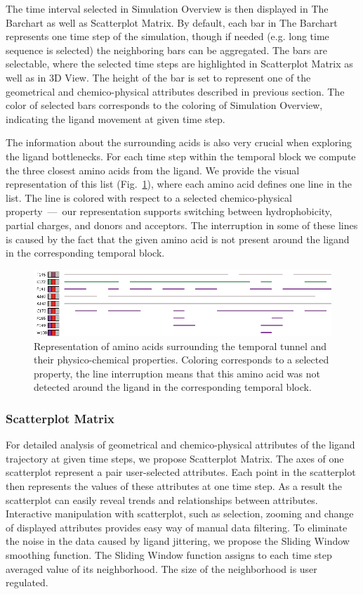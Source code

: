 \documentclass[twocolumn]{bmcart}%
\begin{document}
The time interval selected in Simulation Overview is then displayed in The Barchart as well as Scatterplot Matrix.
By default, each bar in The Barchart represents one time step of the simulation, though if needed (e.g. long time sequence is selected) the neighboring bars can be aggregated.
The bars are selectable, where the selected time steps are highlighted in Scatterplot Matrix as well as in 3D View.
The height of the bar is set to represent one of the geometrical and chemico-physical attributes described in previous section.
The color of selected bars corresponds to the coloring of Simulation Overview, indicating the ligand movement at given time step.

The information about the surrounding acids is also very crucial when exploring the ligand bottlenecks. 
For each time step within the temporal block we compute the three closest amino acids from the ligand. 
We provide the visual representation of this list (Fig.~\ref{fig:aacids}), where each amino acid defines one line in the list. 
The line is colored with respect to a selected chemico-physical property~---~our representation supports switching between hydrophobicity, partial charges, and donors and acceptors.
The interruption in some of these lines is caused by the fact that the given amino acid is not present around the ligand in the corresponding temporal block.

\begin{figure}[htb]
	\centering
  \includegraphics[width=0.95\linewidth]{img/aacids.png}
  \caption{\label{fig:aacids} Representation of amino acids surrounding the temporal tunnel and their physico-chemical properties. Coloring corresponds to a selected property, the line interruption means that this amino acid was not detected around the ligand in the corresponding temporal block.}
\end{figure}


\subsubsection*{Scatterplot Matrix}
For detailed analysis of geometrical and chemico-physical attributes of the ligand trajectory at given time steps, we propose Scatterplot Matrix.
The axes of one scatterplot represent a pair user-selected attributes.
Each point in the scatterplot then represents the values of these attributes at one time step.
As a result the scatterplot can easily reveal trends and relationships between attributes.
Interactive manipulation with scatterplot, such as selection, zooming and change of displayed attributes provides easy way of manual data filtering. 
To eliminate the noise in the data caused by ligand jittering, we propose the Sliding Window smoothing function.
The Sliding Window function assigns to each time step averaged value of its neighborhood.
The size of the neighborhood is user regulated. 
\end{document}
